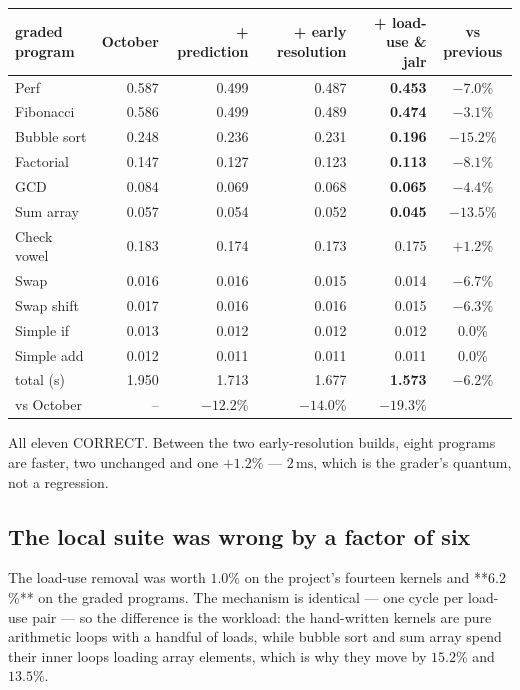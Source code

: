\documentclass[11pt]{article}
\begin{document}
\begin{center}
\small
\begin{tabular}{lrrrrc}
\toprule
graded program & October & + prediction & + early resolution & + load-use \& jalr & vs previous \\
\midrule
Perf        & 0.587 & 0.499 & 0.487 & \textbf{0.453} & $-7.0$\% \\
Fibonacci   & 0.586 & 0.499 & 0.489 & \textbf{0.474} & $-3.1$\% \\
Bubble sort & 0.248 & 0.236 & 0.231 & \textbf{0.196} & $-15.2$\% \\
Factorial   & 0.147 & 0.127 & 0.123 & \textbf{0.113} & $-8.1$\% \\
GCD         & 0.084 & 0.069 & 0.068 & \textbf{0.065} & $-4.4$\% \\
Sum array   & 0.057 & 0.054 & 0.052 & \textbf{0.045} & $-13.5$\% \\
Check vowel & 0.183 & 0.174 & 0.173 & 0.175 & $+1.2$\% \\
Swap        & 0.016 & 0.016 & 0.015 & 0.014 & $-6.7$\% \\
Swap shift  & 0.017 & 0.016 & 0.016 & 0.015 & $-6.3$\% \\
Simple if   & 0.013 & 0.012 & 0.012 & 0.012 & $0.0$\% \\
Simple add  & 0.012 & 0.011 & 0.011 & 0.011 & $0.0$\% \\
\midrule
total (s)   & 1.950 & 1.713 & 1.677 & \textbf{1.573} & $-6.2$\% \\
vs October  & --    & $-12.2$\% & $-14.0$\% & $\mathbf{-19.3\%}$ & \\
\bottomrule
\end{tabular}
\end{center}

All eleven CORRECT. Between the two early-resolution builds, eight programs are faster, two
unchanged and one $+1.2$\% --- $2\,\mathrm{ms}$, which is the grader's quantum, not a
regression.

\subsection{The local suite was wrong by a factor of six}

The load-use removal was worth $1.0$\% on the project's fourteen kernels and **$6.2$\%** on the
graded programs. The mechanism is identical --- one cycle per load-use pair --- so the
difference is the workload: the hand-written kernels are pure arithmetic loops with a handful
of loads, while bubble sort and sum array spend their inner loops loading array elements, which
is why they move by $15.2$\% and $13.5$\%.
\end{document}
